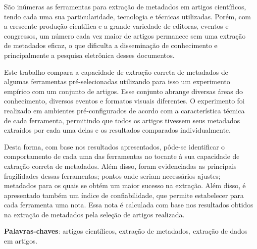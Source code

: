 
\setlength{\absparsep}{18pt} %
\begin{resumo}


São inúmeras as ferramentas para extração de metadados em artigos científicos, tendo cada uma sua particularidade, tecnologia e técnicas utilizadas. 
Porém, com a crescente produção científica e a grande variedade de editoras, eventos e congressos, um número cada vez maior de artigos permanece sem uma extração de metadados eficaz, 
o que dificulta a disseminação de conhecimento e principalmente a pesquisa eletrônica desses documentos.

Este trabalho compara a capacidade de extração correta de metadados de algumas ferramentas pré-selecionadas utilizando para isso um experimento empírico com um conjunto de artigos.
Esse conjunto abrange diversas áreas do conhecimento, diversos eventos e formatos visuais diferentes. 
O experimento foi realizado em ambientes pré-configurados de acordo com a característica técnica de cada ferramenta, permitindo que todos os artigos tivessem seus metadados extraídos por cada uma delas e os resultados comparados individualmente. 

Desta forma, com base nos resultados apresentados, pôde-se identificar o comportamento de cada uma das ferramentas no tocante à sua capacidade de extração correta de metadados.
Além disso, foram evidenciadas as principais fragilidades dessas ferramentas; pontos onde seriam necessários ajustes; metadados para os quais se obtém um maior sucesso na extração. 
Além disso, é apresentado também um índice de confiabilidade, que permite estabelecer para cada ferramenta uma nota.
Essa nota é calculada com base nos resultados obtidos na extração de metadados pela seleção de artigos realizada.

\textbf{Palavras-chaves}: artigos científicos, extração de metadados, extração de dados em artigos.

\end{resumo}

